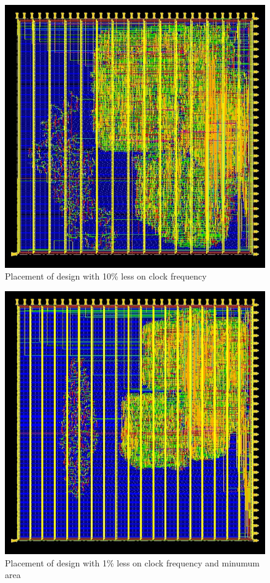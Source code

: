 \begin{figure}[!htbp]
\centering
\captionsetup{justification=centering}
\includegraphics[scale=0.5,angle=0]{../project/physical_design/images_10/DLX_IR_SIZE32_PC_SIZE32_10_place_prerouting.jpg}
\caption{Placement of design with 10\% less on clock frequency}
\label{fig:plac10}
\end{figure}






\begin{figure}[!htbp]
\centering
\captionsetup{justification=centering}
\includegraphics[scale=0.5,angle=0]{../project/physical_design/images_1_minarea/DLX_IR_SIZE32_PC_SIZE32_1_minarea_place_prerouting.jpg}
\caption{Placement of design with 1\% less on clock frequency and minumum area}
\label{fig:plac1minarea}
\end{figure}
